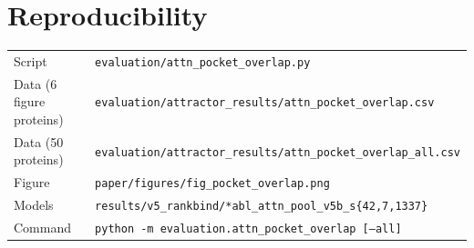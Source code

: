 \documentclass[11pt]{article}
\begin{document}
\section*{Reproducibility}

\begin{tabular}{ll}
Script & \texttt{evaluation/attn\_pocket\_overlap.py} \\
Data (6 figure proteins) & \texttt{evaluation/attractor\_results/attn\_pocket\_overlap.csv} \\
Data (50 proteins) & \texttt{evaluation/attractor\_results/attn\_pocket\_overlap\_all.csv} \\
Figure & \texttt{paper/figures/fig\_pocket\_overlap.png} \\
Models & \texttt{results/v5\_rankbind/*abl\_attn\_pool\_v5b\_s\{42,7,1337\}} \\
Command & \texttt{python -m evaluation.attn\_pocket\_overlap [--all]} \\
\end{tabular}
\end{document}
